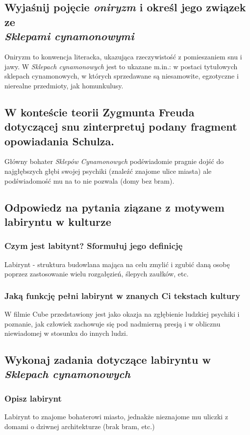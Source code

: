 \documentclass[a4paper]{article}
\begin{document}
\subsection{Wyjaśnij pojęcie \emph{oniryzm} i określ jego związek ze\\\emph{Sklepami cynamonowymi}}
Oniryzm to konwencja literacka, ukazująca rzeczywistość z pomieszaniem snu i jawy. W \emph{Sklepach cynamonowych} jest to ukazane m.in.: w postaci tytułowych sklepach cynamonowych, w których sprzedawane są niesamowite, egzotyczne i nierealne przedmioty, jak homunkulusy.
\subsection{W konteście teorii Zygmunta Freuda dotyczącej snu zinterpretuj podany fragment opowiadania Schulza.}
Główny bohater \emph{Sklepów Cynamonowych} podświadomie pragnie dojść do najgłębszych głębi swojej psychiki (znaleźć znajome ulice miasta) ale podświadomość mu na to nie pozwala (domy bez bram).
\subsection{Odpowiedz na pytania ziązane z motywem labiryntu w kulturze}
\subsubsection{Czym jest labitynt? Sformułuj jego definicję}
Labirynt - struktura budowlana mająca na celu zmylić i zgubić daną osobę poprzez zastosowanie wielu rozgałęzień, ślepych zaułków, etc.
\subsubsection{Jaką funkcję pełni labirynt w znanych Ci tekstach kultury}
W filmie Cube przedstawiony jest jako okazja na zgłębienie ludzkiej psychiki i poznanie, jak człowiek zachowuje się pod nadmierną presją i w oblicznu niewia\-domej w stosunku do innych ludzi.
\subsection{Wykonaj zadania dotyczące labiryntu w \emph{Sklepach cynamonowych}}
\subsubsection{Opisz labirynt}
Labirynt to znajome bohaterowi miasto, jednakże nieznajome mu uliczki z domami o dziwnej architekturze (brak bram, etc.)
\end{document}
